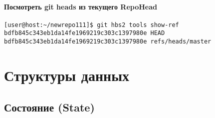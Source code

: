 \documentclass[11pt,a4paper]{article}
\begin{document}
\paragraph{Посмотреть git heads из текущего RepoHead}

\begin{verbatim}
[user@host:~/newrepo111]$ git hbs2 tools show-ref
bdfb845c343eb1da14fe1969219c303c1397980e HEAD
bdfb845c343eb1da14fe1969219c303c1397980e refs/heads/master
\end{verbatim}

\section{Структуры данных}

\subsection{Состояние (State)}
\end{document}
